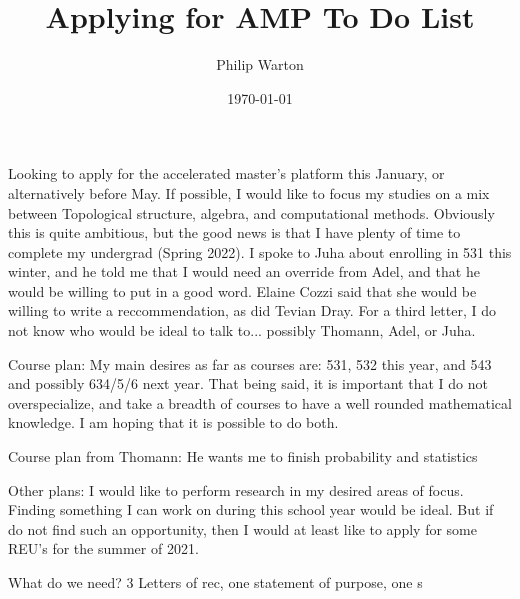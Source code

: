 \documentclass{article}
\begin{document}
\title{Applying for AMP To Do List}
\author{Philip Warton}
\date{\today}
\maketitle
Looking to apply for the accelerated master's platform this January, or alternatively before May.
If possible, I would like to focus my studies on a mix between Topological structure, algebra, and computational methods.
Obviously this is quite ambitious, but the good news is that I have plenty of time to complete my undergrad (Spring 2022).
I spoke to Juha about enrolling in 531 this winter, and he told me that I would need an override from Adel, and that he would
be willing to put in a good word. Elaine Cozzi said that she would be willing to write a reccommendation, as did Tevian Dray.
For a third letter, I do not know who would be ideal to talk to... possibly Thomann, Adel, or Juha.

Course plan:
My main desires as far as courses are: 531, 532 this year, and 543 and possibly 634/5/6 next year. That being said, it is important that I
do not overspecialize, and take a breadth of courses to have a well rounded mathematical knowledge. I am hoping that it is possible to do both.

Course plan from Thomann:
He wants me to finish probability and statistics

Other plans: I would like to perform research in my desired areas of focus. Finding something I can work on during this school year would be
ideal. But if do not find such an opportunity, then I would at least like to apply for some REU's for the summer of 2021.

What do we need? 3 Letters of rec, one statement of purpose, one s
\end{document}
